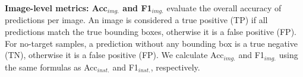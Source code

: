 \textbf{Image-level metrics: Acc$_{img.}$ and F1$_{img.}$} evaluate the overall accuracy of predictions per image.
An image is considered a true positive (TP) if all predictions match the true bounding boxes, otherwise it is a false positive (FP). For no-target samples, a prediction without any bounding box is a true negative (TN), otherwise it is a false positive (FP). We calculate Acc$_{img.}$ and F1$_{img.}$ using the same formulas as Acc$_{inst.}$ and F1$_{inst.}$, respectively.


